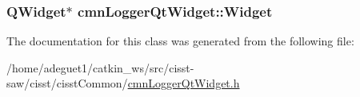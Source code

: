 \hypertarget{classcmn_logger_qt_widget_a114372899f6105a298324c8737d32a5f}{
\subsubsection[{Widget}]{\setlength{\rightskip}{0pt plus 5cm}Q\-Widget$\ast$ cmn\-Logger\-Qt\-Widget\-::\-Widget\hspace{0.3cm}{\ttfamily [protected]}}}\label{classcmn_logger_qt_widget_a114372899f6105a298324c8737d32a5f}


The documentation for this class was generated from the following file\-:\begin{DoxyCompactItemize}
\item 
/home/adeguet1/catkin\-\_\-ws/src/cisst-\/saw/cisst/cisst\-Common/\hyperlink{cmn_logger_qt_widget_8h}{cmn\-Logger\-Qt\-Widget.\-h}\end{DoxyCompactItemize}
